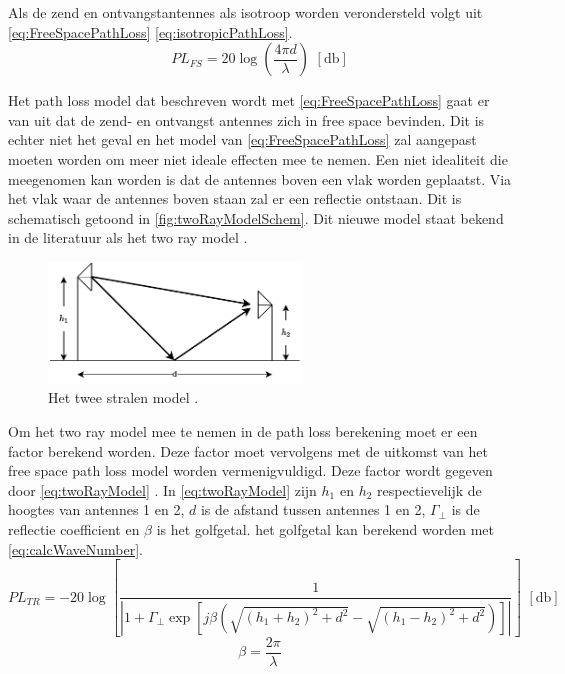 Als de zend en ontvangstantennes als isotroop worden verondersteld volgt uit \autoref{eq:FreeSpacePathLoss} \autoref{eq:isotropicPathLoss}.
\begin{equation} \label{eq:isotropicPathLoss}
    PL_{FS}=20\log\left(\frac{4\pi d}{\lambda}\right) \,\,\left[\unit{\decibel}\right]
\end{equation}

Het path loss model dat beschreven wordt met \autoref{eq:FreeSpacePathLoss} gaat er van uit dat de zend- en ontvangst antennes zich in free space bevinden. Dit is echter niet het geval en het model van \autoref{eq:FreeSpacePathLoss} zal aangepast moeten worden om meer niet ideale effecten mee te nemen. Een niet idealiteit die meegenomen kan worden is dat de antennes boven een vlak worden geplaatst. Via het vlak waar de antennes boven staan zal er een reflectie ontstaan. Dit is schematisch getoond in \autoref{fig:twoRayModelSchem}. Dit nieuwe model staat bekend in de literatuur als het two ray model \cite{MobileAntenaSystemsHandbookCH2}.
\begin{figure}[h]
    \centering
    \includegraphics[width=0.6\textwidth]{img/twoRayModel}
    \caption{Het twee stralen model \cite{MobileAntenaSystemsHandbookCH2}.}
    \label{fig:twoRayModelSchem}
\end{figure}

Om het two ray model mee te nemen in de path loss berekening moet er een factor berekend worden. Deze factor moet vervolgens met de uitkomst van het free space path loss model worden vermenigvuldigd. Deze factor wordt gegeven door \autoref{eq:twoRayModel} \cite{MobileAntenaSystemsHandbookCH2,brini2019system}. In \autoref{eq:twoRayModel} zijn $h_1$ en $h_2$ respectievelijk de hoogtes van antennes 1 en 2, $d$ is de afstand tussen antennes 1 en 2, $\Gamma_\bot$ is de reflectie coefficient en $\beta$ is het golfgetal. het golfgetal kan berekend worden met \autoref{eq:calcWaveNumber}. 
\begin{equation}\label{eq:twoRayModel}
    PL_{TR}=-20\log\left[\frac{1}{\left|1+\Gamma_\bot\exp\left[j\beta \left(\sqrt{\left(h_1+h_2\right)^2+d^2}-\sqrt{\left(h_1-h_2\right)^2+d^2}\right)\right]\right|}\right] \,\,\left[\unit{\decibel}\right]
\end{equation}
\begin{equation}\label{eq:calcWaveNumber}
    \beta=\frac{2\pi}{\lambda}
\end{equation}

